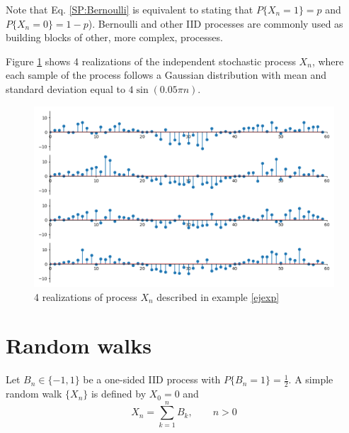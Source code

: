 Note that Eq. \eqref{SP:Bernoulli} is equivalent to stating that $P\{X_n=1\} = p$ and $P\{X_n=0\} = 1-p$). Bernoulli and other IID processes are commonly used as building blocks of other, more complex, processes.

\begin{example}
\label{ejexp}
Figure \ref{fig:noisy_sin} shows 4 realizations of the independent stochastic process $X_n$, where each sample of the process follows a Gaussian distribution with mean and standard deviation equal to $4 \sin\left(0.05 \pi n \right)$. 
\end{example}

  
\begin{figure}[htb]
\begin{center}
\includegraphics[width=12cm]{Figures/sp_noisy_sin.png} 
\caption{4 realizations of process $X_n$ described in example \ref{ejexp}}
      \label{fig:noisy_sin}
  \end{center}
\end{figure}



\section{Random walks}

\begin{definition}
Let $B_n \in \{-1, 1\}$ be a one-sided IID process with $P\{B_n= 1\}=\frac{1}{2}$. A simple random walk $\{X_n\}$ is defined by $X_0 = 0$ and
\begin{equation}
X_n = \sum_{k=1}^n B_k,    \qquad n>0
\label{sp:srw_def}
\end{equation}

\end{definition}

